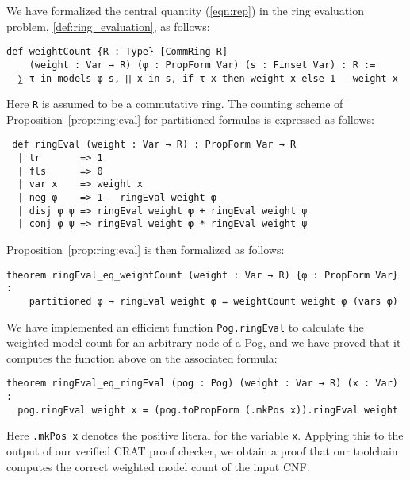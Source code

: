 We have formalized the central quantity (\ref{eqn:rep}) in the ring evaluation problem,
\cref{def:ring_evaluation}, as follows:
\begin{lstlisting}
def weightCount {R : Type} [CommRing R]
    (weight : Var → R) (φ : PropForm Var) (s : Finset Var) : R :=
  ∑ τ in models φ s, ∏ x in s, if τ x then weight x else 1 - weight x
\end{lstlisting}
Here \lstinline{R} is assumed to be a commutative ring.
The counting scheme of Proposition~\ref{prop:ring:eval} for partitioned formulas is expressed as follows:
\begin{lstlisting}
 def ringEval (weight : Var → R) : PropForm Var → R
  | tr       => 1
  | fls      => 0
  | var x    => weight x
  | neg φ    => 1 - ringEval weight φ
  | disj φ ψ => ringEval weight φ + ringEval weight ψ
  | conj φ ψ => ringEval weight φ * ringEval weight ψ
\end{lstlisting}
Proposition~\ref{prop:ring:eval} is then formalized as follows:
\begin{lstlisting}
theorem ringEval_eq_weightCount (weight : Var → R) {φ : PropForm Var} :
    partitioned φ → ringEval weight φ = weightCount weight φ (vars φ)
\end{lstlisting}

We have implemented an efficient function \lstinline{Pog.ringEval} to calculate the weighted model count
for an arbitrary node of a Pog, and we have proved that it computes the function above on the
associated formula:
\begin{lstlisting}
theorem ringEval_eq_ringEval (pog : Pog) (weight : Var → R) (x : Var) :
  pog.ringEval weight x = (pog.toPropForm (.mkPos x)).ringEval weight
\end{lstlisting}
Here \lstinline{.mkPos x} denotes the positive literal for the variable \lstinline{x}.
Applying this to the output of our verified CRAT proof checker,
we obtain a proof that
our toolchain computes the correct weighted model count of the input CNF.

